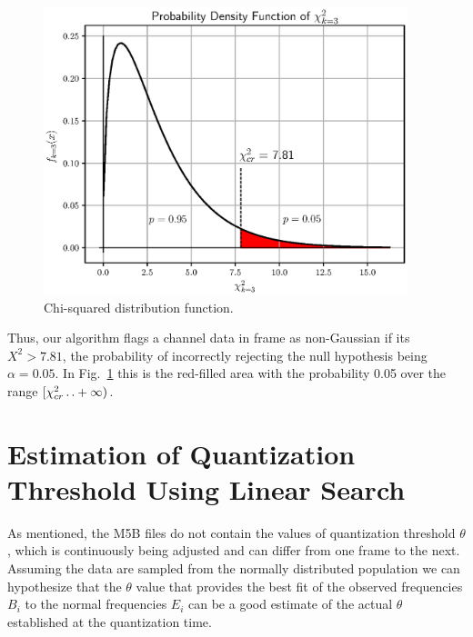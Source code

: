 \documentclass[letterpaper,twoside,12pt]{article}
\newcommand{\twodots}{\mathinner {\ldotp \ldotp}}
\begin{document}
\begin{figure}[ht!]
  \begin{center}
  \includegraphics[width=25pc]{fig_chi2_pdf.eps}
  \caption{\small Chi-squared distribution function.}
  \label{chi2_pdf}
  \end{center}
\end{figure}

Thus, our algorithm flags a channel data in frame as non-Gaussian if its $X^2 > 7.81$, the probability of incorrectly rejecting the null hypothesis being $\alpha = 0.05$. In Fig.~\ref{chi2_pdf} this is the red-filled area with the probability 0.05 over the range $[\chi^2_{cr} \twodots +\infty)$. 



\section{Estimation of Quantization Threshold Using Linear Search}

As mentioned, the M5B files do not contain the values of quantization threshold $\theta$, which is continuously being adjusted and can differ from one frame to the next. Assuming the data are sampled from the normally distributed population we can hypothesize that the $\theta$ value that provides the best fit of the observed frequencies $B_i$ to the normal frequencies $E_i$ can be a good estimate of the actual $\theta$ established at the quantization time.
\end{document}

